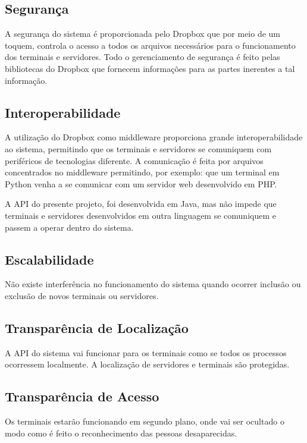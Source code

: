 \documentclass[letterpaper, 10 pt, conference]{ieeeconf}  %
\begin{document}
\subsection{Seguran\c{c}a} A seguran\c{c}a do sistema \'e proporcionada pelo Dropbox que por meio de um toquem, controla o acesso a todos os arquivos necess\'arios para o funcionamento dos terminais e servidores. Todo o gerenciamento de seguran\c{c}a \'e feito pelas bibliotecas do Dropbox que fornecem informa\c{c}\~oes para as partes inerentes a tal informa\c{c}\~ao.   

\subsection{Interoperabilidade}

A utiliza\c{c}\~ao do Dropbox como middleware proporciona grande interoperabilidade ao sistema, permitindo que os terminais e servidores se comuniquem com perif\'ericos de tecnologias diferente. A comunica\c{c}\~ao \'e feita por arquivos concentrados no middleware permitindo, por exemplo: que um terminal em Python venha a se comunicar com um servidor web desenvolvido em PHP. 

A API do presente projeto, foi desenvolvida em Java, mas n\~ao impede que terminais e servidores desenvolvidos em outra linguagem se comuniquem e passem a operar dentro do sistema.     

\subsection{Escalabilidade}
N\~ao  existe interfer\^encia no funcionamento do sistema quando ocorrer inclus\~ao ou exclus\~ao de novos terminais ou servidores. 

\subsection{Transpar\^encia de Localiza\c{c}\~ao}
A API do sistema vai funcionar para os terminais como se todos os processos ocorressem localmente. A localiza\c{c}\~ao de servidores e terminais s\~ao protegidas.

\subsection{Transpar\^encia de Acesso}
Os terminais estar\~ao funcionando em segundo plano, onde vai ser ocultado o modo como \'e feito o reconhecimento das pessoas desaparecidas.
\end{document}
